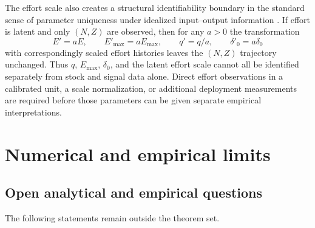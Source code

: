 \documentclass[11pt]{article}
\begin{document}
The effort scale also creates a structural identifiability boundary in the standard sense of parameter uniqueness under idealized input--output information \cite{bellman1970,villaverde2016}. If effort is latent and only $(N,Z)$ are observed, then for any $a>0$ the transformation
\[
E'=aE,\qquad E'_{\max}=aE_{\max},\qquad q'=q/a,
\qquad \delta'_0=a\delta_0
\]
with correspondingly scaled effort histories leaves the $(N,Z)$ trajectory unchanged. Thus $q$, $E_{\max}$, $\delta_0$, and the latent effort scale cannot all be identified separately from stock and signal data alone. Direct effort observations in a calibrated unit, a scale normalization, or additional deployment measurements are required before those parameters can be given separate empirical interpretations.

\section{Numerical and empirical limits}

\subsection{Open analytical and empirical questions}

The following statements remain outside the theorem set.
\end{document}
